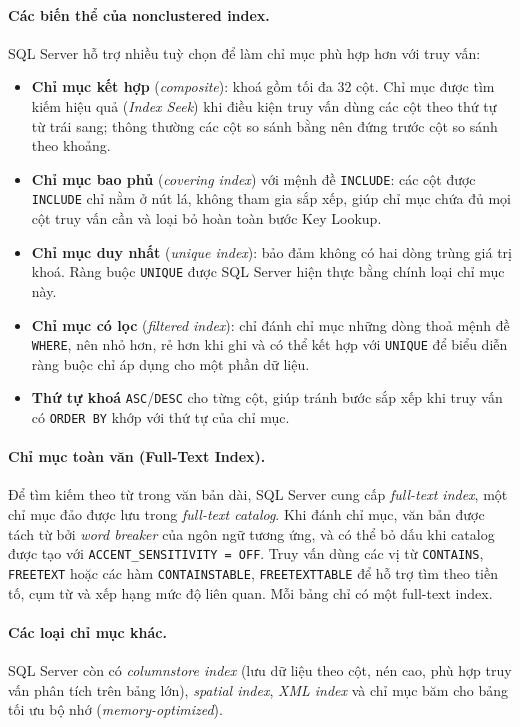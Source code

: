 \paragraph{Các biến thể của nonclustered index.} SQL Server hỗ trợ nhiều tuỳ chọn để làm chỉ mục phù hợp hơn với truy vấn:

\begin{itemize}
    \item \textbf{Chỉ mục kết hợp} (\emph{composite}): khoá gồm tối đa 32 cột. Chỉ mục được tìm kiếm hiệu quả (\emph{Index Seek}) khi điều kiện truy vấn dùng các cột theo thứ tự từ trái sang; thông thường các cột so sánh bằng nên đứng trước cột so sánh theo khoảng.
    \item \textbf{Chỉ mục bao phủ} (\emph{covering index}) với mệnh đề \texttt{INCLUDE}: các cột được \texttt{INCLUDE} chỉ nằm ở nút lá, không tham gia sắp xếp, giúp chỉ mục chứa đủ mọi cột truy vấn cần và loại bỏ hoàn toàn bước Key Lookup.
    \item \textbf{Chỉ mục duy nhất} (\emph{unique index}): bảo đảm không có hai dòng trùng giá trị khoá. Ràng buộc \texttt{UNIQUE} được SQL Server hiện thực bằng chính loại chỉ mục này.
    \item \textbf{Chỉ mục có lọc} (\emph{filtered index}): chỉ đánh chỉ mục những dòng thoả mệnh đề \texttt{WHERE}, nên nhỏ hơn, rẻ hơn khi ghi và có thể kết hợp với \texttt{UNIQUE} để biểu diễn ràng buộc chỉ áp dụng cho một phần dữ liệu.
    \item \textbf{Thứ tự khoá} \texttt{ASC}/\texttt{DESC} cho từng cột, giúp tránh bước sắp xếp khi truy vấn có \texttt{ORDER BY} khớp với thứ tự của chỉ mục.
\end{itemize}

\paragraph{Chỉ mục toàn văn (Full-Text Index).} Để tìm kiếm theo từ trong văn bản dài, SQL Server cung cấp \emph{full-text index}, một chỉ mục đảo được lưu trong \emph{full-text catalog}. Khi đánh chỉ mục, văn bản được tách từ bởi \emph{word breaker} của ngôn ngữ tương ứng, và có thể bỏ dấu khi catalog được tạo với \texttt{ACCENT\_SENSITIVITY = OFF}. Truy vấn dùng các vị từ \texttt{CONTAINS}, \texttt{FREETEXT} hoặc các hàm \texttt{CONTAINSTABLE}, \texttt{FREETEXTTABLE} để hỗ trợ tìm theo tiền tố, cụm từ và xếp hạng mức độ liên quan. Mỗi bảng chỉ có một full-text index.

\paragraph{Các loại chỉ mục khác.} SQL Server còn có \emph{columnstore index} (lưu dữ liệu theo cột, nén cao, phù hợp truy vấn phân tích trên bảng lớn), \emph{spatial index}, \emph{XML index} và chỉ mục băm cho bảng tối ưu bộ nhớ (\emph{memory-optimized}).

